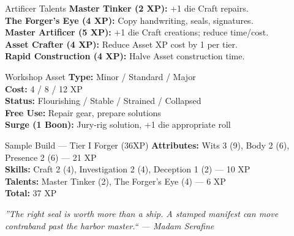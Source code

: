 \documentclass[10pt]{article}
\begin{document}
\hfill
\begin{minipage}[t]{0.48\linewidth}
    \begin{charbox}{Artificer Talents}
        \textbf{Master Tinker (2 XP):} +1 die Craft repairs.\\
        \textbf{The Forger's Eye (4 XP):} Copy handwriting, seals, signatures.\\
        \textbf{Master Artificer (5 XP):} +1 die Craft creations; reduce time/cost.\\
        \textbf{Asset Crafter (4 XP):} Reduce Asset XP cost by 1 per tier.\\
        \textbf{Rapid Construction (4 XP):} Halve Asset construction time.
    \end{charbox}
    
    \vspace{0.5em}
    
    \begin{charbox}{Workshop Asset}
        \textbf{Type:} Minor / Standard / Major\\
        \textbf{Cost:} 4 / 8 / 12 XP\\
        \textbf{Status:} Flourishing / Stable / Strained / Collapsed\\
        \textbf{Free Use:} Repair gear, prepare solutions\\
        \textbf{Surge (1 Boon):} Jury-rig solution, +1 die appropriate roll
    \end{charbox}
    
    \vspace{0.5em}
    
    \begin{charbox}{Sample Build --- Tier I Forger (36XP)}
        \textbf{Attributes:} Wits 3 (9), Body 2 (6), Presence 2 (6) --- 21 XP\\
        \textbf{Skills:} Craft 2 (4), Investigation 2 (4), Deception 1 (2) --- 10 XP\\
        \textbf{Talents:} Master Tinker (2), The Forger's Eye (4) --- 6 XP\\
        \textbf{Total:} 37 XP
    \end{charbox}
\end{minipage}

\vspace{0.5em}
\begin{center}
    {\small\sffamily\itshape ''The right seal is worth more than a ship. A stamped manifest can move contraband past the harbor master.`` --- Madam Serafine}
\end{center}
\end{document}
